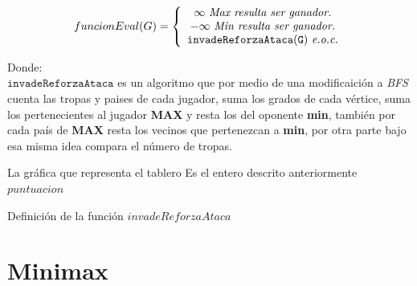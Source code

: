 \documentclass[12pt]{article}
\begin{document}
$$ 
funcionEval(G)= \left\{\begin{array}{c l}
  \infty\ \textit{Max\ resulta\ ser\ ganador.}\\
  -\infty\ \textit{Min\ resulta\ ser\ ganador.}\\
  \mathtt{invadeReforzaAtaca(G)}\ \textit{e.o.c.}
\end{array}
\right.
$$

Donde:\\

$\mathtt{invadeReforzaAtaca}$ es un algoritmo que por medio de una modificaici\'on a \textit{BFS} cuenta
las tropas y paises de cada jugador, suma los grados de cada v\'ertice, suma los pertenecientes al jugador \textbf{MAX} 
y resta los del oponente \textbf{min}, tambi\'en por cada pa\'is de \textbf{MAX} resta los vecinos que pertenezcan 
a \textbf{min}, por otra parte bajo esa misma idea compara el n\'umero de tropas.\\

\begin{algorithm}
\begin{algorithmic}[1]
\REQUIRE La gr\'afica que representa el tablero
\ENSURE Es el entero descrito anteriormente
\ENDFOR
{}
\ENDIF
{}
\ENDIF
{}
\ENDIF
{}
\ENDIF
{}
\ENDIF
{}
\ENDIF
{}
\ENDIF
{}
\ENDIF
\ENDFOR
\ENDWHILE
\RETURN $puntuacion$
\end{algorithmic}
\caption{Definici\'on de la funci\'on $invadeReforzaAtaca$}
\label{invadeReforzaAtaca}
\end{algorithm}

\section{Minimax}
\end{document}
